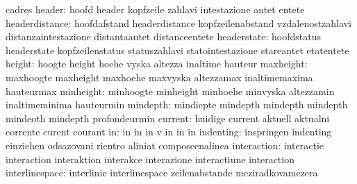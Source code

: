                            cadres
                   header: hoofd                     header
                           kopfzeile                 zahlavi
                           intestazione              antet
                           entete
           headerdistance: hoofdafstand              headerdistance
                           kopfzeilenabstand         vzdalenostzahlavi
                           distanzaintestazione      distantaantet
                           distanceentete
              headerstate: hoofdstatus               headerstate
                           kopfzeilenstatus          statuszahlavi
                           statointestazione         stareantet
                           etatentete
                   height: hoogte                    height
                           hoehe                     vyska
                           altezza                   inaltime
                           hauteur
                maxheight: maxhoogte                 maxheight
                           maxhoehe                  maxvyska
                           altezzamax                inaltimemaxima
                           hauteurmax
                minheight: minhoogte                 minheight
                           minhoehe                  minvyska
                           altezzamin                inaltimeminima
                           hauteurmin
                 mindepth: mindiepte                 mindepth
                           mindepth                  mindepth
                           mindeoth                  mindepth
                           profondeurmin
                  current: huidige                   current
                           aktuell                   aktualni
                           corrente                  curent
                           courant
                       in: in                        in
                           in                        v
                           in                        in
                           in
                indenting: inspringen                indenting
                           einziehen                 odsazovani
                           rientro                   aliniat
                           composeenalinea
              interaction: interactie                interaction
                           interaktion               interakce
                           interazione               interactiune
                           interaction
           interlinespace: interlinie                interlinespace
                           zeilenabstande            meziradkovamezera
